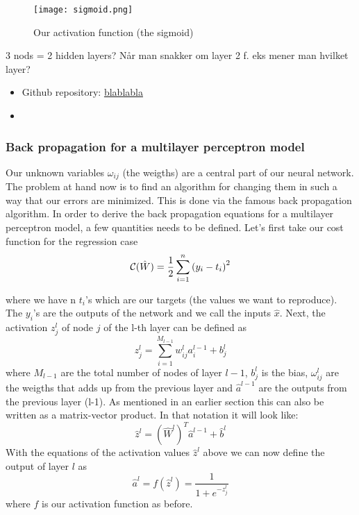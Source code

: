 \documentclass[a4paper,12pt]{article}
\begin{document}
\begin{figure}[h!]
  \centering
  \caption{Our activation function (the sigmoid)}
  \texttt{[image: sigmoid.png]}
\end{figure}



3 nods = 2 hidden layers? Når man snakker om layer 2 f. eks mener man hvilket layer?\newline

\begin{itemize}
\item Github repository: \url{blablabla}
\item
\end{itemize}

\subsubsection{Back propagation for a multilayer perceptron model}
Our unknown variables $\omega_{ij}$ (the weigths) are a central part of our neural network. The problem at hand now is to find an algorithm for changing them in such a way that our errors are minimized. This is done via the famous back propagation algorithm.\newline 
In order to derive the back propagation equations for a multilayer perceptron model, a few quantities needs to be defined. Let's first take our cost function for the regression case 
\begin{equation}
   {\cal C}(\hat{W})  =  \frac{1}{2}\sum_{i=1}^n\left(y_i - t_i\right)^2 
\end{equation}

where we have n $t_i$'s which are our targets (the values we want to reproduce). The $y_i$'s are the outputs of the network and we call the inputs $\hat{x}$.\newline
Next, the activation $z_j^l$ of node $j$ of the l-th layer can be defined as
\begin{equation}
    z_j^l = \sum_{i=1}^{M_{l-1}}w_{ij}^la_i^{l-1}+b_j^l
\end{equation}
where $M_{l-1}$ are the total number of nodes of layer $l-1$, $b_j^l$ is the bias, $\omega_{ij}^l$ are the weigths that adds up from the previous layer and $\hat{a}^{l-1}$ are the outputs from the previous layer (l-1). As mentioned in an earlier section this can also be written as a matrix-vector product. In that notation it will look like:
\begin{equation}
    \hat{z}^l = \left(\hat{W}^l\right)^T\hat{a}^{l-1}+\hat{b}^l
\end{equation}
With the equations of the activation values $\hat{z}^l$ above we can now define the output of layer $l$ as
\begin{equation}
    \hat{a}^l = f(\hat{z}^l) = \frac{1}{1 + e^{-z_j^l}}
\end{equation}
where $f$ is our activation function as before.\newline
\end{document}
